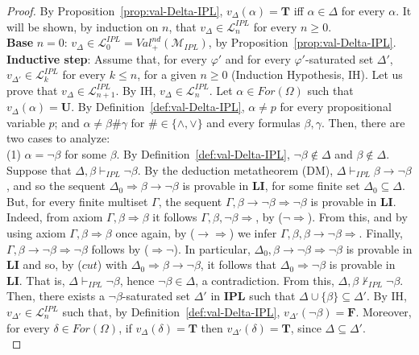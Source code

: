 \documentclass[12pt]{article}
\newcommand{\bT}{\mathbf{T}}
\newcommand{\bU}{\mathbf{U}}
\newcommand{\bF}{\mathbf{F}}
\begin{document}
\begin{proof}
 By Proposition~\ref{prop:val-Delta-IPL}, $v_\Delta(\alpha)=\bT$ iff $\alpha \in \Delta$ for every $\alpha$. It will be shown, by induction on $n$, that $v_\Delta \in \mathcal{L}^{IPL}_n$ for every $n \geq 0$.\\[1mm]
{\bf Base} $n=0$: $v_\Delta \in \mathcal{L}^{IPL}_0 = Val^{nd}_+(\mathcal{M}_{IPL})$, by Proposition~\ref{prop:val-Delta-IPL}.\\[1mm]
{\bf Inductive step}: Assume that, for every $\varphi'$ and for every $\varphi'$-saturated set $\Delta'$, $v_{\Delta'} \in \mathcal{L}^{IPL}_k$ for every $k \leq n$, for a given $n \geq 0$ (Induction Hypothesis, IH). Let us prove that  $v_\Delta \in \mathcal{L}^{IPL}_{n+1}$. By IH, $v_\Delta \in  \mathcal{L}^{IPL}_n$. Let $\alpha \in For(\Omega)$ such that $v_\Delta(\alpha)=\bU$. By Definition~\ref{def:val-Delta-IPL}, $\alpha \neq p$ for every propositional variable $p$; and $\alpha \neq \beta \# \gamma$ for $\#\in \{\land,\vee\}$ and every formulas $\beta,\gamma$. Then, there are two cases to analyze:\\[1mm]
(1) $\alpha =\neg\beta$ for some $\beta$. By Definition~\ref{def:val-Delta-IPL}, $\neg\beta \not\in \Delta$ and  $\beta \not\in \Delta$. Suppose that $\Delta,\beta \vdash_{IPL} \neg\beta$. By the deduction metatheorem (DM),  $\Delta \vdash_{IPL} \beta \to \neg \beta$, and so the sequent  $\Delta_0 \Rightarrow \beta \to \neg \beta$ is provable in {\bf LI}, for some finite set $\Delta_0 \subseteq \Delta$. But, for every finite multiset $\Gamma$, the sequent $\Gamma,\beta \to \neg\beta  \Rightarrow \neg\beta$ is provable in {\bf LI}. Indeed, from axiom  $\Gamma,\beta \Rightarrow \beta$ it follows   $\Gamma,\beta, \neg \beta \Rightarrow$, by ($\neg\Rightarrow$). From this, and by using axiom $\Gamma,\beta \Rightarrow \beta$ once again, by ($\to\Rightarrow$) we infer $\Gamma,\beta, \beta \to \neg\beta  \Rightarrow$. Finally, $\Gamma,\beta \to \neg\beta  \Rightarrow \neg\beta$ follows by ($\Rightarrow\neg$). In particular, $\Delta_0,\beta \to \neg\beta  \Rightarrow \neg\beta$ is provable in {\bf LI} and so, by ($cut$) with $\Delta_0 \Rightarrow \beta \to \neg \beta$, it follows that  $\Delta_0 \Rightarrow \neg \beta$ is provable in {\bf LI}. That is, $\Delta \vdash_{IPL} \neg\beta$, hence $\neg\beta \in \Delta$, a contradiction. From this, $\Delta,\beta \nvdash_{IPL} \neg\beta$. Then, there exists a $\neg\beta$-saturated set $\Delta'$ in \textbf{IPL} such that $\Delta \cup \{\beta\} \subseteq \Delta'$. By IH, $v_{\Delta'} \in  \mathcal{L}^{IPL}_n$ such that, by Definition~\ref{def:val-Delta-IPL}, $v_{\Delta'}(\neg\beta)=\bF$. Moreover, for every $\delta \in  For(\Omega)$, if $v_\Delta(\delta)=\bT$ then  $v_{\Delta'}(\delta)=\bT$, since $\Delta \subseteq \Delta'$.\\[1mm]

\end{proof}
\end{document}
